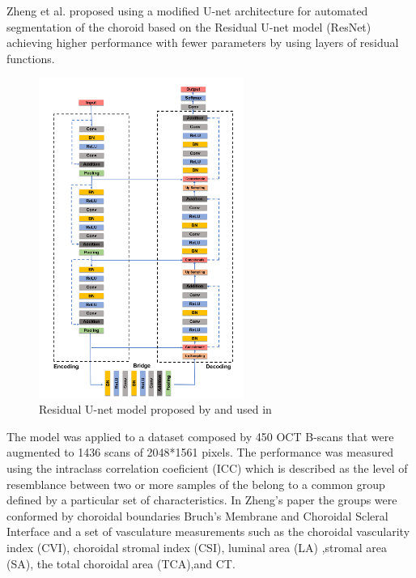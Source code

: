 \documentclass[12pt,a4paper]{scrartcl}
\begin{document}
Zheng et al. \cite{Zheng2020} proposed using a modified U-net architecture for automated segmentation of the choroid based on the Residual U-net model (ResNet) \cite{He2015} achieving higher performance with fewer parameters by using layers of residual functions. 
\begin{figure}[H]
    \centering
    \includegraphics[width=0.6\textwidth]{./images/ResNet-architecture.png}
    \caption{Residual U-net model proposed by \cite{He2015} and used in \cite{Zheng2020}}
\end{figure}

The model was applied to a dataset composed by 450 OCT B-scans that were augmented to 1436 scans of 2048*1561 pixels. The performance was measured using the intraclass correlation coeficient (ICC) which is described as the level of resemblance between two or more samples of the belong to a common group defined by a particular set of characteristics. In Zheng's paper the groups were conformed by choroidal boundaries Bruch's Membrane and Choroidal Scleral Interface and a set of vasculature measurements such as the choroidal vascularity index (CVI), choroidal stromal index (CSI), luminal area (LA) ,stromal area (SA), the total choroidal area (TCA),and CT.
\end{document}
